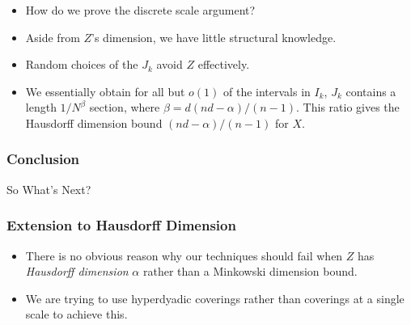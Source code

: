 \documentclass[usenames,dvipsnames]{beamer}
\begin{document}
\begin{frame}
\begin{center}
\end{center}

    \begin{itemize}
        \item How do we prove the discrete scale argument?

        \item Aside from $Z$'s dimension, we have little structural knowledge.

        \item Random choices of the $J_k$ avoid $Z$ effectively.

        \item We essentially obtain for all but $o(1)$ of the intervals in $I_k$, $J_k$ contains a length $1/N^\beta$ section, where $\beta = d(nd - \alpha)/(n - 1)$. This ratio gives the Hausdorff dimension bound $(nd-\alpha)/(n-1)$ for $X$.
    \end{itemize}
\end{frame}

\begin{frame}
    \frametitle{Conclusion}

    {\Huge So What's Next?}
\end{frame}

\begin{frame}
    \frametitle{Extension to Hausdorff Dimension}

    \begin{itemize}
        \item There is no obvious reason why our techniques should fail when $Z$ has {\it Hausdorff dimension} $\alpha$ rather than a Minkowski dimension bound.

        \item We are trying to use hyperdyadic coverings rather than coverings at a single scale to achieve this.
    \end{itemize}
\end{frame}
\end{document}

